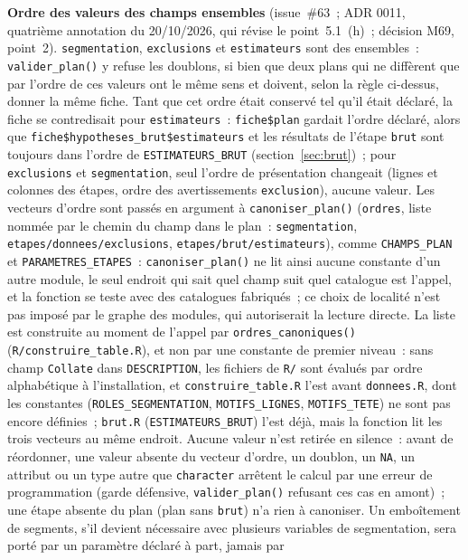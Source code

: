 \documentclass[a4paper,11pt]{article}
\newcommand{\code}[1]{\texttt{\small #1}}
\begin{document}
\medskip
\noindent
\textbf{Ordre des valeurs des champs ensembles} (issue~\#63~; ADR 0011,
quatrième annotation du 20/10/2026, qui révise le point~5.1~(h)~; décision
M69, point~2). \code{segmentation}, \code{exclusions} et \code{estimateurs}
sont des ensembles~: \code{valider\_plan()} y refuse les doublons, si bien
que deux plans qui ne diffèrent que par l'ordre de ces valeurs ont le même
sens et doivent, selon la règle ci-dessus, donner la même fiche. Tant que
cet ordre était conservé tel qu'il était déclaré, la fiche se contredisait
pour \code{estimateurs}~: \code{fiche\$plan} gardait l'ordre déclaré, alors
que \code{fiche\$hypotheses\_brut\$estimateurs} et les résultats de l'étape
\code{brut} sont toujours dans l'ordre de \code{ESTIMATEURS\_BRUT}
(section~\ref{sec:brut})~; pour \code{exclusions} et \code{segmentation},
seul l'ordre de présentation changeait (lignes et colonnes des étapes,
ordre des avertissements \code{exclusion}), aucune valeur. Les vecteurs
d'ordre sont passés en argument à \code{canoniser\_plan()}
(\code{ordres}, liste nommée par le chemin du champ dans le plan~:
\code{segmentation}, \code{etapes/donnees/exclusions},
\code{etapes/brut/estimateurs}), comme \code{CHAMPS\_PLAN} et
\code{PARAMETRES\_ETAPES}~: \code{canoniser\_plan()} ne lit ainsi aucune
constante d'un autre module, le seul endroit qui sait quel champ suit quel
catalogue est l'appel, et la fonction se teste avec des catalogues
fabriqués~; ce choix de localité n'est pas imposé par le graphe des
modules, qui autoriserait la lecture directe. La liste est construite au
moment de l'appel par \code{ordres\_canoniques()}
(\code{R/construire\_table.R}), et non par une constante de premier niveau~:
sans champ \code{Collate} dans \code{DESCRIPTION}, les fichiers de
\code{R/} sont évalués par ordre alphabétique à l'installation, et
\code{construire\_table.R} l'est avant \code{donnees.R}, dont les
constantes (\code{ROLES\_SEGMENTATION}, \code{MOTIFS\_LIGNES},
\code{MOTIFS\_TETE}) ne sont pas encore définies~; \code{brut.R}
(\code{ESTIMATEURS\_BRUT}) l'est déjà, mais la fonction lit les trois
vecteurs au même endroit. Aucune valeur n'est
retirée en silence~: avant de réordonner, une valeur absente du vecteur
d'ordre, un doublon, un \code{NA}, un attribut ou un type autre que
\code{character} arrêtent le calcul par une erreur de programmation
(garde défensive, \code{valider\_plan()} refusant ces cas en amont)~; une
étape absente du plan (plan sans \code{brut}) n'a rien à canoniser. Un
emboîtement de segments, s'il devient nécessaire avec plusieurs variables
de segmentation, sera porté par un paramètre déclaré à part, jamais par
\end{document}
